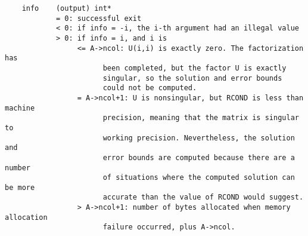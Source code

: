 \begin{verbatim}
    info    (output) int*
            = 0: successful exit   
            < 0: if info = -i, the i-th argument had an illegal value   
            > 0: if info = i, and i is   
                 <= A->ncol: U(i,i) is exactly zero. The factorization has   
                       been completed, but the factor U is exactly   
                       singular, so the solution and error bounds   
                       could not be computed.   
                 = A->ncol+1: U is nonsingular, but RCOND is less than machine
                       precision, meaning that the matrix is singular to
                       working precision. Nevertheless, the solution and
                       error bounds are computed because there are a number
                       of situations where the computed solution can be more
                       accurate than the value of RCOND would suggest.   
                 > A->ncol+1: number of bytes allocated when memory allocation
                       failure occurred, plus A->ncol.
   
\end{verbatim}


